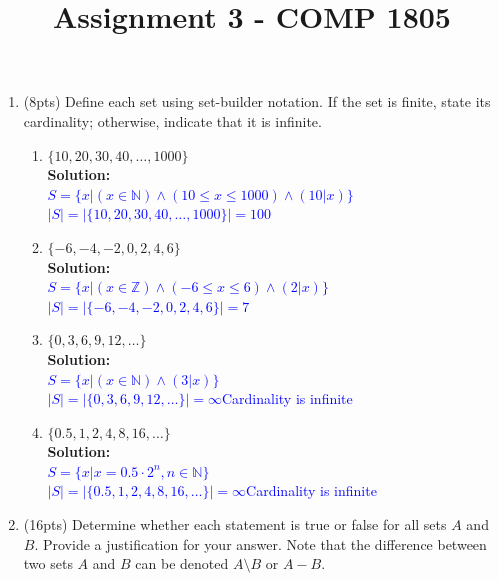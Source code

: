 \documentclass{article}
\newcommand{\sol}[1]{\textbf{Solution:\,}\textcolor{blue}{#1}}
\begin{document}

\title{Assignment 3 - COMP 1805}
\date{} %
\maketitle
\thispagestyle{fancy}



\medskip
\begin{enumerate}



\item(8pts) Define each set using set-builder notation. If the set is finite, state its cardinality; otherwise, indicate that it is infinite.

\begin{enumerate}
\item $\{ 10, 20, 30, 40,  \ldots, 1000 \}$
\\\sol{
\\$S=\{x|(x\in\mathbb{N})\land(10\leq x\leq 1000)\land (10|x)\}$
\\$|S|=|\{ 10, 20, 30, 40,  \ldots, 1000 \}|=100$
}
\item $\{ -6, -4, -2, 0, 2, 4, 6 \}$
\\\sol{
\\$S=\{x|(x\in\mathbb{Z})\land(-6\leq x\leq 6)\land (2|x)\}$
\\$|S|=|\{ -6, -4, -2, 0, 2, 4, 6 \}|=7$
}
\item $\{ 0,3,6,9,12, \ldots \}$
\\\sol{
\\$S=\{x|(x\in\mathbb{N})\land(3|x)\}$
\\$|S|=|\{ 0,3,6,9,12, \ldots \}|=\infty$\quad Cardinality is infinite
}
\item $\{ 0.5, 1, 2, 4, 8, 16, \ldots \}$
\\\sol{
\\$S=\{x|x=0.5\cdot2^n,n\in\mathbb{N}\}$
\\$|S|=|\{ 0.5, 1, 2, 4, 8, 16, \ldots \}|=\infty$\quad Cardinality is infinite
}
\end{enumerate}

\newpage

\item(16pts) Determine whether each statement is true or false for all sets $A$ and $B$. Provide a justification for your answer. Note that the difference between two sets $A$ and $B$ can be denoted $A \setminus B$ or $A - B$. 


\end{enumerate}
\end{document}

